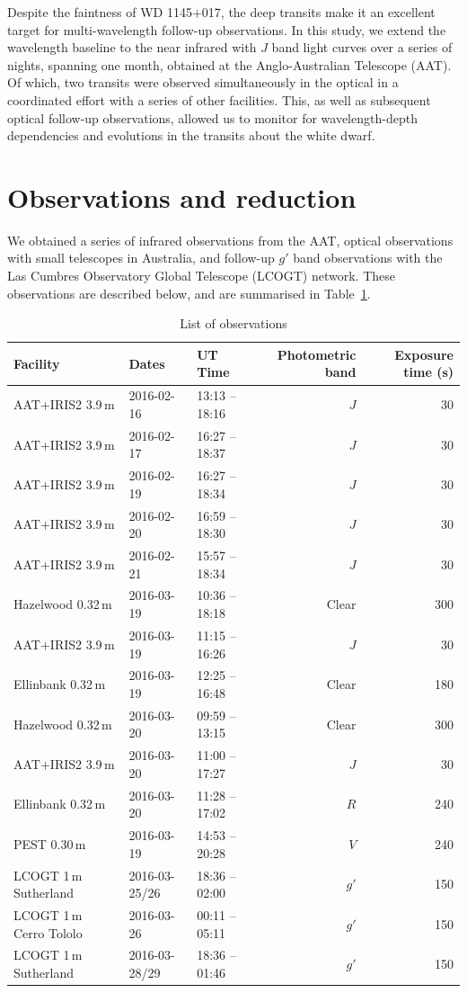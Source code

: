 \documentclass[iop,useAMES,usenatbig]{emulateapj}
\begin{document}
Despite the faintness of WD 1145+017, the deep transits make it an excellent target for multi-wavelength follow-up observations. In this study, we extend the wavelength baseline to the near infrared with $J$ band light curves over a series of nights, spanning one month, obtained at the Anglo-Australian Telescope (AAT). Of which, two transits were observed simultaneously in the optical in a coordinated effort with a series of other facilities. This, as well as subsequent optical follow-up observations, allowed us to monitor for wavelength-depth dependencies and evolutions in the transits about the white dwarf.

\section{Observations and reduction}
\label{sec:observations}

We obtained a series of infrared observations from the AAT, optical observations with small telescopes in Australia, and follow-up $g'$ band observations with the Las Cumbres Observatory Global Telescope (LCOGT) network. These observations are described below, and are summarised in Table~\ref{tab:observations}. 

\begin{table}
\centering
\caption{\label{tab:observations}List of observations}
\begin{tabular}{lllrr}
\hline\hline
Facility & Dates & UT Time & Photometric band & Exposure time (s) \\
\hline
AAT+IRIS2 3.9\,m & 2016-02-16 & 13:13 -- 18:16 & $J$ & 30 \\
AAT+IRIS2 3.9\,m & 2016-02-17 & 16:27 -- 18:37 & $J$ & 30 \\
AAT+IRIS2 3.9\,m & 2016-02-19 & 16:27 -- 18:34 & $J$ & 30 \\
AAT+IRIS2 3.9\,m & 2016-02-20 & 16:59 -- 18:30 & $J$ & 30 \\
AAT+IRIS2 3.9\,m & 2016-02-21 & 15:57 -- 18:34 & $J$ & 30 \\
Hazelwood 0.32\,m & 2016-03-19 & 10:36 -- 18:18 & Clear & 300 \\
AAT+IRIS2 3.9\,m & 2016-03-19 & 11:15 -- 16:26 & $J$ & 30 \\
Ellinbank 0.32\,m & 2016-03-19 & 12:25 -- 16:48 & Clear & 180 \\
Hazelwood 0.32\,m & 2016-03-20 & 09:59 -- 13:15 & Clear & 300 \\
AAT+IRIS2 3.9\,m & 2016-03-20 & 11:00 -- 17:27 & $J$ & 30 \\
Ellinbank 0.32\,m & 2016-03-20 & 11:28 -- 17:02 & $R$ & 240 \\
PEST 0.30\,m & 2016-03-19 & 14:53 -- 20:28 & $V$ & 240 \\
LCOGT 1\,m Sutherland & 2016-03-25/26 & 18:36 -- 02:00 & $g'$ & 150 \\
LCOGT 1\,m Cerro Tololo & 2016-03-26 & 00:11 -- 05:11 & $g'$ & 150 \\
LCOGT 1\,m Sutherland & 2016-03-28/29 & 18:36 -- 01:46 & $g'$ & 150 \\
\hline
\end{tabular}
\end{table}
\end{document}
